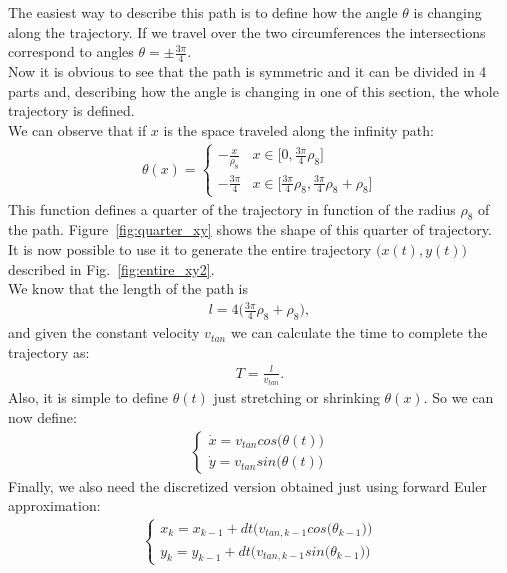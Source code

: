 The easiest way to describe this path is to define how the angle $\theta$ is changing along the trajectory. If we travel over the two circumferences the intersections correspond to angles $\theta = \pm \frac{3\pi}{4}$. \\
Now it is obvious to see that the path is symmetric and it can be divided in 4 parts and, describing how the angle is changing in one of this section, the whole trajectory is defined.\\
We can observe that if $x$ is the space traveled along the infinity path:
\begin{align}
\theta(x) =
\begin{cases}
    -\frac{x}{\rho_{8}}  &x\in \Big[0,\frac{3\pi}{4}\rho_{8}\Big] \quad \quad \ \ \  \\[10pt]
    -\frac{3\pi}{4} &x\in \Big[\frac{3\pi}{4}\rho_{8} ,\frac{3\pi}{4}\rho_{8} + \rho_{8}\Big]
\end{cases}
\end{align}
This function defines a quarter of the trajectory in function of the radius $\rho_{8}$ of the path. Figure~\ref{fig:quarter_xy} shows the shape of this quarter of trajectory.\\
It is now possible to use it to generate the entire trajectory $\big(x(t), y(t)\big)$ described in Fig.~\ref{fig:entire_xy2}.\\
We know that the length of the path is 
\begin{align}
l = 4\Big(\frac{3\pi}{4}\rho_{8} + \rho_{8}\Big),
\end{align}
and given the constant velocity $v_{tan}$ we can calculate the time to complete the trajectory as:
\begin{align}
T = \frac{l}{v_{tan}}.
\end{align}
Also, it is simple to define $\theta(t)$ just stretching or shrinking $\theta(x)$. So we can now define:
\begin{align}
\begin{cases}
\dot{x} = v_{tan} cos\big(\theta(t)\big) \\[10pt]
\dot{y} = v_{tan} sin\big(\theta(t)\big)
\end{cases}
\end{align}
Finally, we also need the discretized version obtained just using forward Euler approximation:
\begin{align}
\begin{cases}
x_k = x_{k-1} + dt \Big(v_{tan,k-1} cos\big(\theta_{k-1}\big)\Big) \\[10pt]
y_k = y_{k-1} + dt \Big(v_{tan,k-1} sin\big(\theta_{k-1}\big)\Big)
\end{cases}
\end{align}
